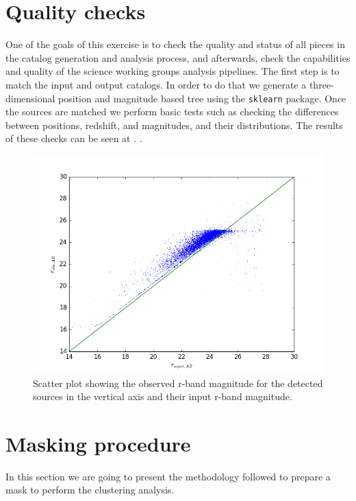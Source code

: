 \documentclass[\docopts]{\docclass}
\begin{document}
\section{Quality checks}
\label{sec:quality}

One of the goals of this exercise is to check the quality and status of all pieces in the catalog generation and analysis process, and afterwards, check the capabilities and quality of the science working groups analysis pipelines. The first step is to match the input and output catalogs. In order to do that we generate a three-dimensional position and magnitude based tree using the \texttt{sklearn} package. Once the sources are matched we perform basic tests such as checking the differences between positions, redshift, and magnitudes, and their distributions. The results of these checks can be seen at . .

\begin{figure}
\centering
\includegraphics[width=0.9\columnwidth]{mag_scatter.png}
\caption{Scatter plot showing the observed r-band magnitude for the detected sources in the vertical axis and their input r-band magnitude.}
\label{fig:basic_tests}
\end{figure}


\section{Masking procedure}
\label{sec:masking}

In this section we are going to present the methodology followed to prepare a mask to perform the clustering analysis.
\end{document}

